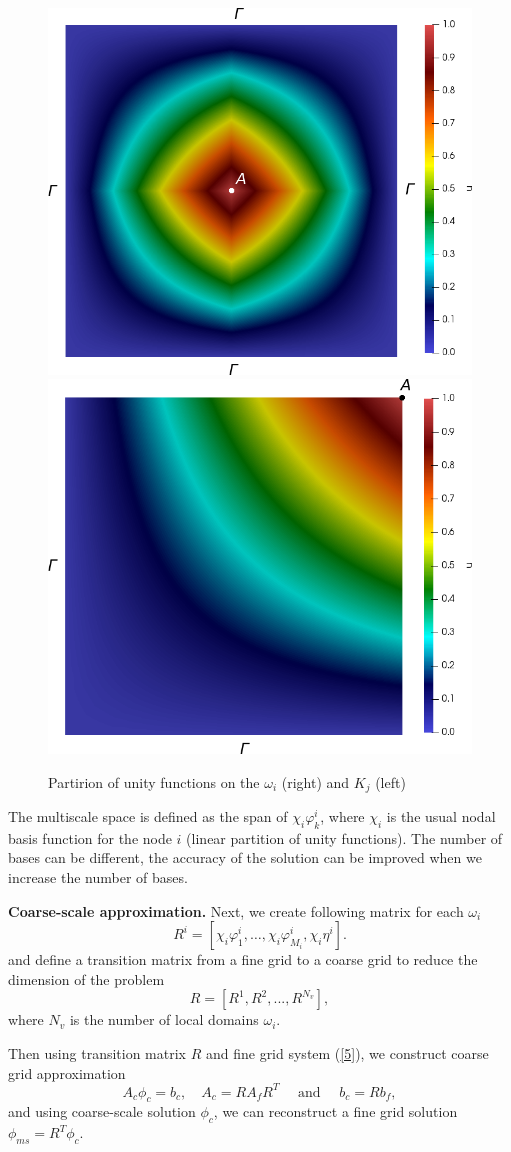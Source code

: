 \documentclass[runningheads]{llncs}
\begin{document}
\begin{figure}[h!]
\centering
\includegraphics[width=0.35\linewidth]{pofs.png} 
\hspace{2em}
\includegraphics[width=0.35\linewidth]{pouK.png} 
\caption{Partirion of unity functions on the $\omega_i$ (right) and $K_j$ (left)}
\label{p2}
\end{figure} 
 
The multiscale space is defined as the span of $\chi_i \varphi^i_k$, where $\chi_i$ is the usual nodal basis function for the node $i$ (linear partition of unity functions). 
The number of bases can be different, the accuracy of the solution can be improved when we increase the number of bases.

\textbf{Coarse-scale approximation. }
Next, we create following  matrix for each $\omega_i$
\[
R^i = \left[ \chi_i \varphi_1^i, \ldots, \chi_i \varphi_{M_i}^i,  \chi_i \eta^i \right].
\]
and  define a transition matrix from a fine grid to a coarse grid to reduce the dimension of the problem
\[
R = [ R^1, R^2, ..., R^{N_v} ],
\]
where $N_v$ is the number of local domains $\omega_i$.

Then using transition matrix $R$ and fine grid system (\ref{5}), we construct coarse grid approximation
\begin{equation}\label{9}
A_c \phi_c = b_c, \quad 
A_c = R A_f R^T 
\quad \text{ and } \quad 
b_c = R b_f,
\end{equation}  
and using coarse-scale solution $\phi_c$, we can  reconstruct a fine grid solution $\phi_{ms} = R^T \phi_c$.
\end{document}
